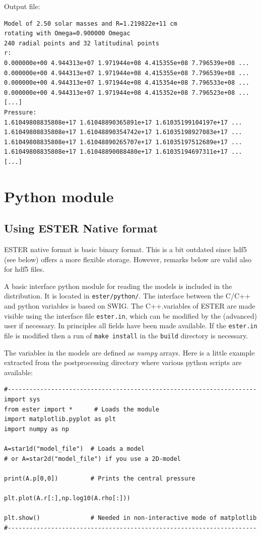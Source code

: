 Output file:
\begin{verbatim}
Model of 2.50 solar masses and R=1.219822e+11 cm
rotating with Omega=0.900000 Omegac
240 radial points and 32 latitudinal points
r:
0.000000e+00 4.944313e+07 1.971944e+08 4.415355e+08 7.796539e+08 ...
0.000000e+00 4.944313e+07 1.971944e+08 4.415355e+08 7.796539e+08 ...
0.000000e+00 4.944313e+07 1.971944e+08 4.415354e+08 7.796533e+08 ...
0.000000e+00 4.944313e+07 1.971944e+08 4.415352e+08 7.796523e+08 ...
[...]
Pressure:
1.61049808835808e+17 1.61048890365891e+17 1.61035199104197e+17 ...
1.61049808835808e+17 1.61048890354742e+17 1.61035198927083e+17 ...
1.61049808835808e+17 1.61048890265707e+17 1.61035197512689e+17 ...
1.61049808835808e+17 1.61048890088480e+17 1.61035194697311e+17 ...
[...]
\end{verbatim} 


\section{Python module}

\subsection{Using ESTER Native format}

ESTER native format is basic binary format. This is a bit outdated since hdf5
(see below) offers a more flexible storage. However, remarks below are valid
also for hdf5 files.

A basic interface python module for reading the models is included in
the distribution. It is located in {\tt ester/python/}. The interface
between the C/C++ and python variables is based on SWIG. The C++.variables
of ESTER are made visible using the interface file \texttt{ester.in},
which can be modified by the (advanced) user if necessary. In principles
all fields have been made available. If the \texttt{ester.in} file
is modified then a run of \texttt{make install} in the \texttt{build}
directory is necessary.

The variables in the models are defined as \emph{numpy} arrays. Here is
a little example extracted from the postprocessing directory where various
python scripts are available:

\begin{verbatim}
#---------------------------------------------------------------------
import sys
from ester import *      # Loads the module
import matplotlib.pyplot as plt
import numpy as np

A=star1d("model_file")  # Loads a model 
# or A=star2d("model_file") if you use a 2D-model

print(A.p[0,0])         # Prints the central pressure

plt.plot(A.r[:],np.log10(A.rho[:]))

plt.show()              # Needed in non-interactive mode of matplotlib
#---------------------------------------------------------------------
\end{verbatim}

